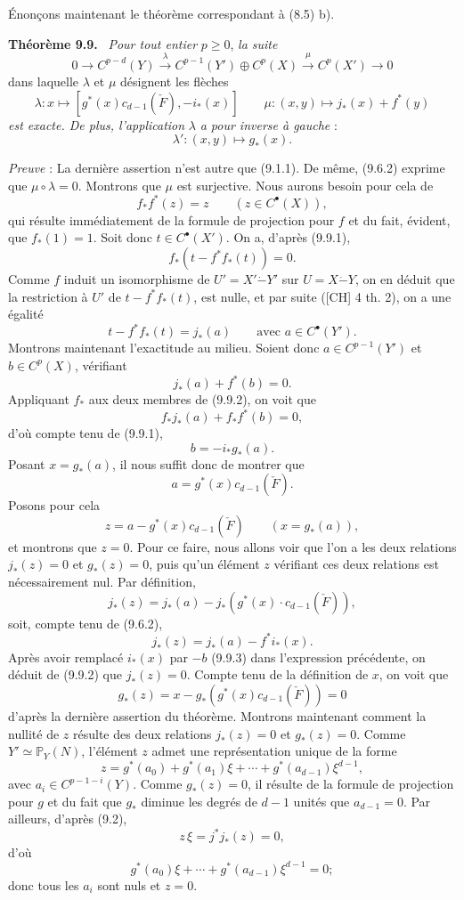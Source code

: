 \documentclass[11pt]{article}
\newenvironment{statement}[1]{\par\medskip\noindent\textbf{#1.}\ }{\par\medskip}
\begin{document}
Énonçons maintenant le théorème correspondant à (8.5) b).

\begin{statement}{Théorème 9.9}
\emph{Pour tout entier} $p\ge0$, \emph{la suite}
\[
0\to C^{p-d}(Y)\xrightarrow{\lambda} C^{p-1}(Y')\oplus C^p(X)\xrightarrow{\mu} C^p(X')\to0
\]
dans laquelle $\lambda$ et $\mu$ désignent les flèches
\[
\lambda:x\mapsto[g^*(x)c_{d-1}(\check F),-i_*(x)]
\qquad
\mu:(x,y)\mapsto j_*(x)+f^*(y)
\]
\emph{est exacte. De plus, l'application} $\lambda$ \emph{a pour inverse à gauche} :
\[
\lambda':(x,y)\mapsto g_*(x).
\]
\end{statement}

\emph{Preuve} : La dernière assertion n'est autre que (9.1.1). De même, (9.6.2) exprime que $\mu\circ\lambda=0$. Montrons que $\mu$ est surjective. Nous aurons besoin pour cela de
\[
f_*f^*(z)=z\qquad(z\in C^{\bullet}(X)),
\tag{9.9.1}
\]
qui résulte immédiatement de la formule de projection pour $f$ et du fait, évident, que $f_*(1)=1$. Soit donc $t\in C^{\bullet}(X')$. On a, d'après (9.9.1),
\[
f_*(t-f^*f_*(t))=0.
\]
Comme $f$ induit un isomorphisme de $U'=X'\mathbin{\dot{-}}Y'$ sur $U=X\mathbin{\dot{-}}Y$, on en déduit que la
restriction à $U'$ de $t-f^*f_*(t)$, est nulle, et par suite ([CH] 4 th. 2), on a une égalité
\[
t-f^*f_*(t)=j_*(a)
\qquad\text{avec }a\in C^{\bullet}(Y').
\]
Montrons maintenant l'exactitude au milieu. Soient donc $a\in C^{p-1}(Y')$ et $b\in C^p(X)$, vérifiant
\[
j_*(a)+f^*(b)=0.
\tag{9.9.2}
\]
Appliquant $f_*$ aux deux membres de (9.9.2), on voit que
\[
f_*j_*(a)+f_*f^*(b)=0,
\]
d'où compte tenu de (9.9.1),
\[
b=-i_*g_*(a).
\tag{9.9.3}
\]
Posant $x=g_*(a)$, il nous suffit donc de montrer que
\[
a=g^*(x)c_{d-1}(\check F).
\tag{9.9.4}
\]
Posons pour cela
\[
z=a-g^*(x)c_{d-1}(\check F)\qquad(x=g_*(a)),
\]
et montrons que $z=0$. Pour ce faire, nous allons voir que l'on a les deux relations $j_*(z)=0$ et $g_*(z)=0$, puis qu'un élément $z$ vérifiant ces deux relations est nécessairement nul. Par définition,
\[
j_*(z)=j_*(a)-j_*(g^*(x)\cdot c_{d-1}(\check F)),
\]
soit, compte tenu de (9.6.2),
\[
j_*(z)=j_*(a)-f^*i_*(x).
\]
Après avoir remplacé $i_*(x)$ par $-b$ (9.9.3) dans l'expression précédente, on déduit de (9.9.2) que $j_*(z)=0$. Compte tenu de la définition de $x$, on voit que
\[
g_*(z)=x-g_*(g^*(x)c_{d-1}(\check F))=0
\]
d'après la dernière assertion du théorème. Montrons maintenant comment la nullité 
de $z$
résulte des deux relations $j_*(z)=0$ et $g_*(z)=0$. Comme $Y'\simeq\mathbb P_Y(N)$, l'élément $z$ admet une représentation unique de la forme
\[
z=g^*(a_0)+g^*(a_1)\xi+\cdots+g^*(a_{d-1})\xi^{d-1},
\]
avec $a_i\in C^{p-1-i}(Y)$. Comme $g_*(z)=0$, il résulte de la formule de projection pour $g$ et du fait que $g_*$ diminue les degrés de $d-1$ unités que $a_{d-1}=0$. Par ailleurs, d'après (9.2),
\[
z\,\xi=j^*j_*(z)=0,
\]
d'où
\[
g^*(a_0)\xi+\cdots+g^*(a_{d-1})\xi^{d-1}=0;
\]
donc tous les $a_i$ sont nuls et $z=0$.
\end{document}

